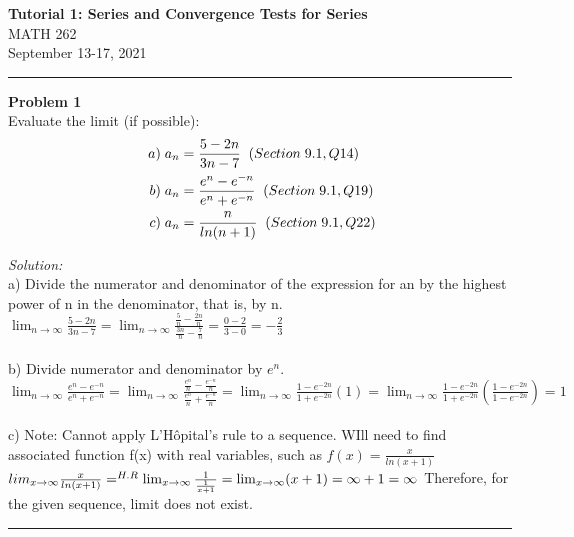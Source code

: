 \documentclass[a4paper, 11pt]{article}
\newenvironment{problem}[2][Problem]
    { \begin{mdframed}[backgroundcolor=gray!20] \textbf{#1 #2} \\}
    {  \end{mdframed}}
\newenvironment{solution}
    {\textit{Solution:}}
    {}
\begin{document}
\noindent
\large\textbf{Tutorial 1: Series and Convergence Tests for Series} \\
\normalsize  MATH 262\\
September 13-17, 2021\\
\noindent\rule{7in}{2.8pt}
\begin{problem}{1}
Evaluate the limit (if possible):
\begin{align*}
    \  a) \; {a_{n}} &= \frac{5-2n}{3n-7} \; \; {\tiny  (Section \; 9.1, Q14)}\\
    \  b) \; {a_{n}} &= \frac{e^{n} - e^{-n}}{e^{n}+e^{-n}} \; \; {\tiny  (Section \; 9.1, Q19)}\\
    \  c) \; {a_{n}} &= \frac{n}{ln(n+1)} \; \; {\tiny  (Section \; 9.1, Q22)}
 \end{align*}
\end{problem}
\begin{solution}\\
a) Divide the numerator and denominator of the expression for an by the highest
power of n in the denominator, that is, by n.
\\
$\lim_{n\to\infty}  \frac{5-2n}{3n-7} = \lim_{n\to\infty} \frac{\frac{5}{n} - \frac{2n}{n}}{\frac{3n}{n} - \frac{7}{n}} = \frac{0-2}{3-0} = -\frac{2}{3} $
\\
\\
b) Divide numerator and denominator by $e^{n}$.
\\
$\lim_{n\to\infty}  \frac{e^{n} - e^{-n}}{e^{n}+e^{-n}} = \lim_{n\to\infty} \frac{\frac{e^{n}}{n}-\frac{e^{-n}}{n}}{\frac{e^{n}}{n}+\frac{e^{-n}}{n}} 
=\lim_{n\to\infty}\frac{1-e^{-2n}}{1+e^{-2n}}(1) =\lim_{n\to\infty}\frac{1-e^{-2n}}{1+e^{-2n}}(\frac{1-e^{-2n}}{1-e^{-2n}})=1
$
\\
\\
c) Note: Cannot apply L'Hôpital's rule to a sequence.  WIll need to find associated function f(x) with real variables, such as  $f(x) = \frac{x}{ln(x+1)} $
\\
$
lim_{x\to\infty}\frac{x}{ln(x+1)}
=^{H.R} \lim_{x\to\infty} \frac{1}{\frac{1}{x+1}} 
= \lim_{x\to\infty} (x+1) = \infty + 1 = \infty
\\
$
Therefore, for the given sequence, limit does not exist.
\\
\end{solution} 
\noindent\rule{7in}{2.8pt}
\\
\end{document}
